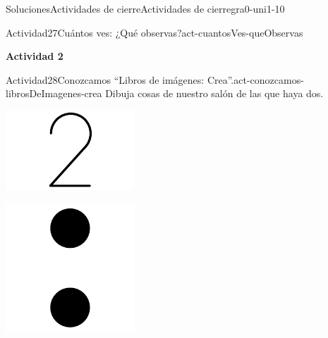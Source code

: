\documentclass[twoside,10pt,]{article}
\begin{document}
\begin{solutions-section}{Soluciones}{Actividades de cierre}{}{Actividades de cierre}{}{}{gra0-uni1-10}
\begin{activitysolution}{Actividad}{27}{Cuántos ves: ¿Qué observas?}{act-cuantosVes-queObservas}
\begin{sidebyside}{2}{0}{0}{0}
\begin{sbspanel}{0.5}
\end{sbspanel}%
\end{sidebyside}%
\end{activitysolution}%
\par\medskip
\noindent\textbf{\large{}\space\textperiodcentered\space{}Actividad 2}
\begin{activitysolution}{Actividad}{28}{Conozcamos “Libros de imágenes: Crea”.}{act-conozcamos-librosDeImagenes-crea}%
Dibuja cosas de nuestro salón de las que haya dos.%
\begin{sidebyside}{2}{0.3}{0.3}{0}%
\begin{sbspanel}{0.2}%
\includegraphics[width=\linewidth]{external/svg-source/tikz-file-148155.pdf}
\end{sbspanel}%
\begin{sbspanel}{0.2}%
\includegraphics[width=\linewidth]{external/svg-source/tikz-file-148154.pdf}

\end{sbspanel}
\end{sidebyside}
\end{activitysolution}
\end{solutions-section}
\end{document}
